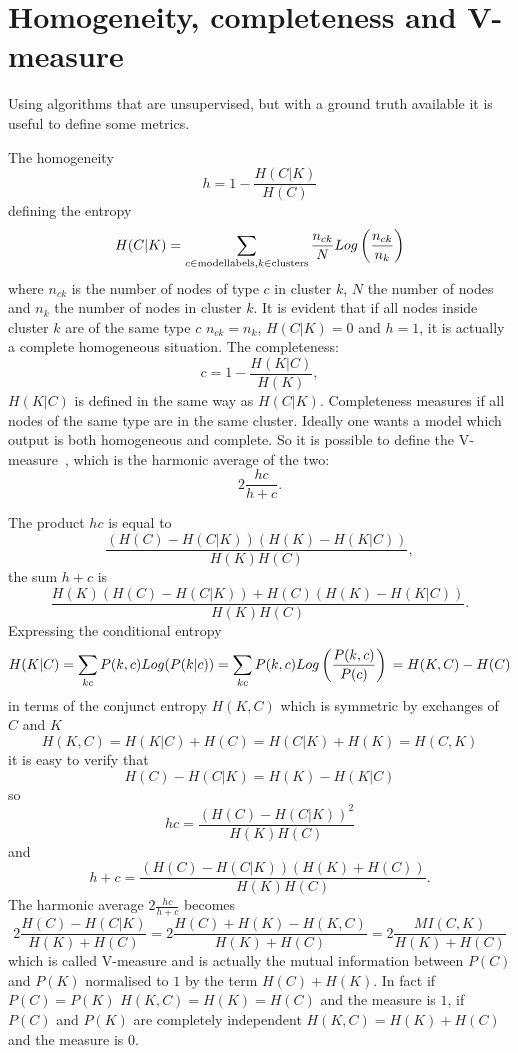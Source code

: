 \chapter{Homogeneity, completeness and V-measure}\label{app:vmeasure}
Using algorithms that are unsupervised, but with a ground truth available it is useful to define some metrics.

The homogeneity
\begin{equation}
    h=1-\frac{H(C|K)}{H(C)}
\end{equation}
defining the entropy
\begin{equation}
    H(C|K)=\sum_{c\in \mathrm{model labels},\\ k \in \mathrm{clusters}}\frac{n_{c k}}{N}Log\left(\frac{n_{c k}}{n_k}\right)
\end{equation}
where $n_{c k}$ is the number of nodes of type $c$ in cluster $k$, $N$ the number of nodes and $n_k$ the number of nodes in cluster $k$. It is evident that if all nodes inside cluster $k$ are of the same type $c$ $n_{c k}=n_{k}$, $H(C|K)=0$ and $h=1$, it is actually a complete homogeneous situation.
The completeness:
\begin{equation}
    c=1-\frac{H(K|C)}{H(K)},
\end{equation}
$H(K|C)$ is defined in the same way as $H(C|K)$. Completeness measures if all nodes of the same type are in the same cluster.
Ideally one wants a model which output is both homogeneous and complete. So it is possible to define the V-measure~\cite{rosenberg2007v}, which is the harmonic average of the two:
\begin{equation}
    2\frac{h c}{h + c}.
\end{equation}

The product $h c$ is equal to
\begin{equation}
    \frac{(H(C)-H(C|K))(H(K)-H(K|C))}{H(K) H(C)},
\end{equation}
the sum $h + c$ is
\begin{equation}
    \frac{H(K)(H(C)-H(C|K))+H(C)(H(K)-H(K|C))}{H(K) H(C)}.
\end{equation}
Expressing the conditional entropy 
\[
H(K|C)=\sum_{k c} P(k,c)Log(P(k|c))
\\=\sum_{k c} P(k,c)Log\left(\frac{P(k,c)}{P(c)}\right)
\\=H(K,C) - H(C)
\]
in terms of the conjunct entropy $H(K,C)$ which is symmetric by exchanges of $C$ and $K$
\[
H(K,C)=H(K|C) + H(C) = H(C|K) + H(K) = H(C,K)
\]
it is easy to verify that 
\[
H(C) - H(C|K) = H(K) - H(K|C) 
\]
so
\[
h c = \frac{(H(C)-H(C|K))^2}{H(K) H(C)}
\]
and
\[
h + c = \frac{(H(C)-H(C|K))(H(K)+H(C))}{H(K) H(C)}.
\]
The harmonic average $2\frac{h c}{h + c}$ becomes
\[
2\frac{H(C)-H(C|K)}{H(K)+H(C)}=2\frac{H(C)+H(K)-H(K,C)}{H(K)+H(C)}=2\frac{MI(C,K)}{H(K)+H(C)}
\]
which is called V-measure and is actually the mutual information between $P(C)$ and $P(K)$ normalised to $1$ by the term $H(C)+H(K)$. In fact if $P(C)=P(K)$ $H(K,C)=H(K)=H(C)$ and the measure is $1$, if $P(C)$ and $P(K)$ are completely independent $H(K,C)=H(K)+H(C)$ and the measure is $0$.
